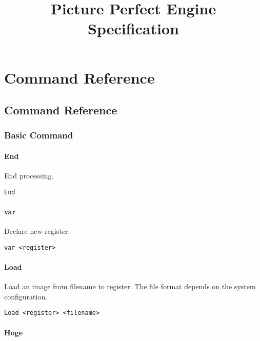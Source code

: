 \documentclass{jsbook}
\title{Picture Perfect Engine Specification}
\begin{document}
\maketitle

\chapter{Command Reference}

\section{Command Reference}

\subsection{Basic Command}

\subsubsection{End}

End processing.

\begin{verbatim}
End
\end{verbatim}

\subsubsection{var}

Declare new register.

\begin{verbatim}
var <register>
\end{verbatim}

\subsubsection{Load}

Load an image from filename to register.
The file format depends on the system configuration.

\begin{verbatim}
Load <register> <filename>
\end{verbatim}

\subsubsection{Hoge}
\end{document}

